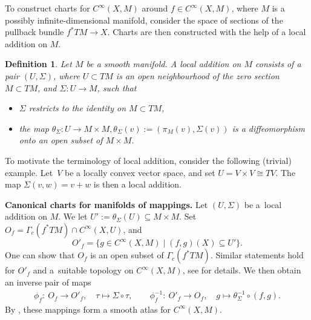 \documentclass[11pt]{article}
\numberwithin{equation}{section}
\numberwithin{equation}{section}
\newtheorem{Definition}[Theorem]{Definition}
\newtheorem{setup}[Theorem]{}
\begin{document}
To construct charts for $C^{\infty}(X,M)$ around $f \in C^{\infty}(X,M)$, where $M$ is a possibly infinite-dimensional manifold, consider the space of sections of the pullback bundle $f^{*}TM \rightarrow X$. Charts are then constructed with the help of a local addition on $M$.

\begin{Definition}%
 Let $M$ be a smooth manifold.
 A \emph{local addition} on $M$ consists of a pair $(U,\Sigma)$, where $U \subset TM$ is an open neighbourhood of the zero section $M \subset TM$, and $\Sigma \colon U \rightarrow M$,
 such that
 \begin{itemize}\itemsep=0pt
 \item $\Sigma$ restricts to the identity on $M \subset TM$,
 \item the map $\theta_\Sigma \colon U \rightarrow M \times M, \theta_\Sigma (v) := (\pi_M(v), \Sigma(v))$ is a diffeomorphism onto an open subset of $M \times M$.
 \end{itemize}
\end{Definition}

To motivate the terminology of local addition, consider the following (trivial) example. Let~$V$ be a locally convex vector space, and set $U = V \times V \cong TV$. The map $\Sigma (v,w) = v+w$ is then a local addition.


{\bf Canonical charts for manifolds of mappings.}
Let $(U,\Sigma)$ be a~local addition on $M$.
We let $U' := \theta_\Sigma (U) \subseteq M \times M$.
Set $O_{f} = \Gamma_c(f^{*}TM) \cap C^{\infty}(X, U)$, and
\begin{equation*}
 O'_{f} = \bigl\{ g \in C^{\infty}(X,M) \mid (f,g)(X) \subseteq U' \bigr\}.
\end{equation*}
One can show that $O_{f}$ is an open subset of $\Gamma_c(f^\ast TM)$. Similar statements hold for $O'_f$ and a~suitable topology on $C^\infty(X,M)$, see \cite[proof of Theorem~1.4]{GaS22} for details.
We then obtain an inverse pair of maps
\begin{align}\label{eq:can_charts}
 \phi_{f}\colon\ O_{f}\rightarrow O'_{f},\quad \tau \mapsto \Sigma \circ \tau, \qquad
 \phi_{f}^{-1}\colon\ O'_{f} \rightarrow O_{f},\quad g \mapsto \theta_{\Sigma}^{-1} \circ (f,g).
\end{align}
By \cite[Theorem~1.4]{GaS22}, these mappings form a smooth atlas for $C^{\infty}(X,M)$.
\end{document}

